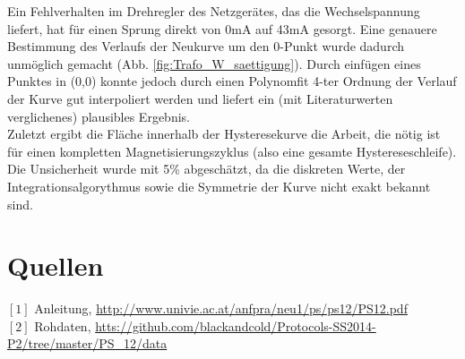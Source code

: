 \documentclass[12pt,a4paper]{article}
\begin{document}
\begin{multicols}{2}
Ein Fehlverhalten im Drehregler des Netzgerätes, das die Wechselspannung liefert, hat  für einen Sprung direkt von 0mA auf 43mA gesorgt. Eine genauere Bestimmung des Verlaufs der Neukurve um den 0-Punkt wurde dadurch unmöglich gemacht (Abb. \ref{fig:Trafo_W_saettigung}). Durch einfügen eines Punktes in (0,0) konnte jedoch durch einen Polynomfit 4-ter Ordnung der Verlauf der Kurve gut interpoliert werden und liefert ein (mit Literaturwerten verglichenes) plausibles Ergebnis.\\

Zuletzt ergibt die Fläche innerhalb der Hysteresekurve die Arbeit, die nötig ist für einen kompletten Magnetisierungszyklus (also eine gesamte Hystereseschleife).\\
Die Unsicherheit wurde mit 5\% abgeschätzt, da die diskreten Werte, der Integrationsalgorythmus sowie die Symmetrie der Kurve nicht exakt bekannt sind.


\section{Quellen}
$[1]$ Anleitung, \url{http://www.univie.ac.at/anfpra/neu1/ps/ps12/PS12.pdf}\\
$[2]$ Rohdaten, \url{htts://github.com/blackandcold/Protocols-SS2014-P2/tree/master/PS_12/data}\\

\end{multicols}
\end{document}
